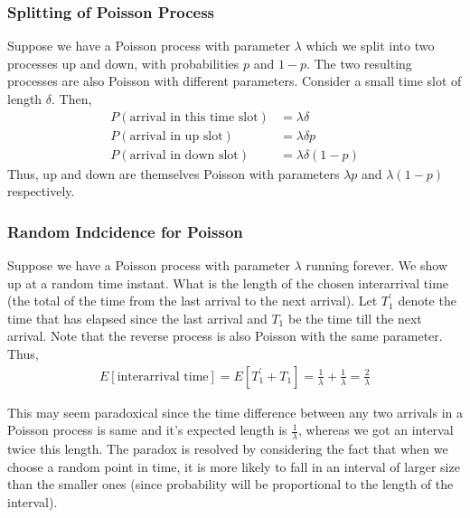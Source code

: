\documentclass[../../probability-notes.tex]{subfiles}
\begin{document}
    \subsubsection{Splitting of Poisson Process}
    Suppose we have a Poisson process with parameter $\lambda$ which we split into two processes up and down, with probabilities $p$ and $1-p$. The two resulting processes are also Poisson with different parameters.\newline
    Consider a small time slot of length $\delta$. Then,
    \begin{align*}
        P(\text{arrival in this time slot}) &= \lambda \delta\\
        P(\text{arrival in up slot}) &= \lambda \delta p\\
        P(\text{arrival in down slot}) &= \lambda \delta (1-p)
    \end{align*}
    Thus, up and down are themselves Poisson with parameters $\lambda p$ and $\lambda (1-p)$ respectively.

    \subsubsection{Random Indcidence for Poisson}
    Suppose we have a Poisson process with parameter $\lambda$ running forever. We show up at a random time instant. What is the length of the chosen interarrival time (the total of the time from the last arrival to the next arrival).\newline
    Let $T_{1}^{'}$ denote the time that has elapsed since the last arrival and $T_{1}$ be the time till the next arrival. Note that the reverse process is also Poisson with the same parameter. Thus,
    \begin{align*}
        E[\text{interarrival time}] = E[T_{1}^{'} + T_{1}] = \frac{1}{\lambda} + \frac{1}{\lambda} = \frac{2}{\lambda}
    \end{align*}

    This may seem paradoxical since the time difference between any two arrivals in a Poisson process is same and it's expected length is $\frac{1}{\lambda}$, whereas we got an interval twice this length. The paradox is resolved by considering the fact that when we choose a random point in time, it is more likely to fall in an interval of larger size than the smaller ones (since probability will be proportional to the length of the interval).\newline
\end{document}
